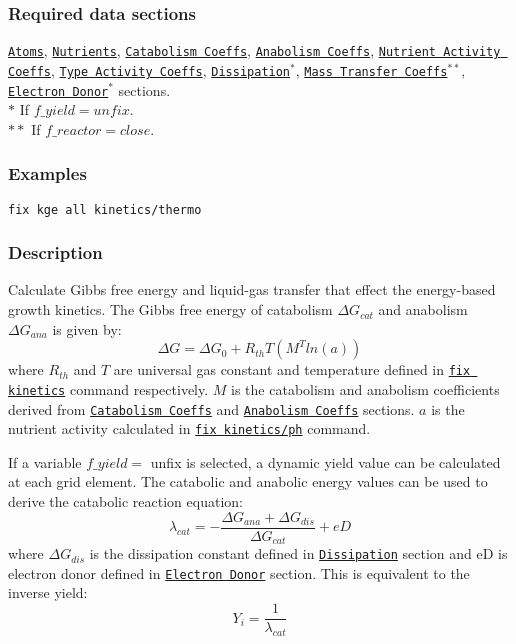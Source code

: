 \documentclass[11pt,a4paper,openright]{article}
\begin{document}
\subsubsection*{Required data sections}
\hyperref[satom]{\tt Atoms}, 
\hyperref[snutrients]{\tt Nutrients}, 
\hyperref[scata]{\tt Catabolism Coeffs},
\hyperref[sana]{\tt Anabolism Coeffs},
\hyperref[sactivitycoeff]{\tt Nutrient Activity Coeffs},
\hyperref[stactivitycoeff]{\tt Type Activity Coeffs},
\hyperref[sdiss]{\tt Dissipation$^{*}$},
\hyperref[skla]{\tt Mass Transfer Coeffs$^{**}$},
\hyperref[sed]{\tt Electron Donor$^{*}$} sections. \\

\noindent $*$ If $f\_yield = unfix$.\\
\noindent $**$ If $f\_reactor = close$.

\subsubsection*{Examples}

\begin{Verbatim}[frame=single]
fix kge all kinetics/thermo
\end{Verbatim}

\subsubsection*{Description}

Calculate Gibbs free energy and liquid-gas transfer that effect the energy-based growth kinetics.
The Gibbs free energy of catabolism $\Delta G_{cat}$ and anabolism $\Delta G_{ana}$  is given by:
\[ \Delta G = \Delta G_0 + R_{th}T(M^Tln(a))\]
where $R_{th}$ and $T$ are universal gas constant and temperature defined in 
\hyperref[fkinetics]{\tt fix kinetics} command respectively. $M$ is the catabolism and anabolism coefficients 
derived from \hyperref[scata]{\tt Catabolism Coeffs} and \hyperref[sana]{\tt Anabolism Coeffs} sections.
$a$ is the nutrient activity calculated in \hyperref[fkineticsph]{\tt fix kinetics/ph} command. 

If a variable $f\_yield = $ unfix is selected, a dynamic yield value can be calculated
at each grid element.
The catabolic and anabolic energy values can be used to derive the catabolic reaction equation:
\[\lambda_{cat} = -\frac{\Delta G_{ana} + \Delta G_{dis}}{\Delta G_{cat}} + eD\]
where $\Delta G_{dis}$ is the dissipation constant defined in 
\hyperref[sdiss]{\tt Dissipation} section and eD is electron donor defined in
\hyperref[sed]{\tt Electron Donor} section.
This is equivalent to the inverse yield:
\[Y_i = \frac{1}{\lambda_{cat}} \]
\end{document}
